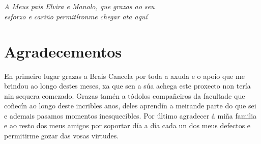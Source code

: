 
\chapter*{}

\begin{flushright}
\emph{A Meus pais Elvira e Manolo, que grazas ao seu \\esforzo e cariño permitíronme chegar ata aquí}
\end{flushright}


\chapter*{Agradecementos}

En primeiro lugar grazas a Brais Cancela por toda a axuda e o apoio que me brindou 
ao longo destes meses, xa que sen a súa achega este proxecto non tería nin sequera comezado.
Grazas tamén a tódolos compañeiros da facultade que coñecín ao longo deste incribles anos,
deles aprendín a meirande parte do que sei e ademais pasamos momentos inesquecibles. Por
último agradecer á miña familia e ao resto dos meus amigos por soportar día a día cada 
un dos meus defectos e permitirme gozar das vosas virtudes.
